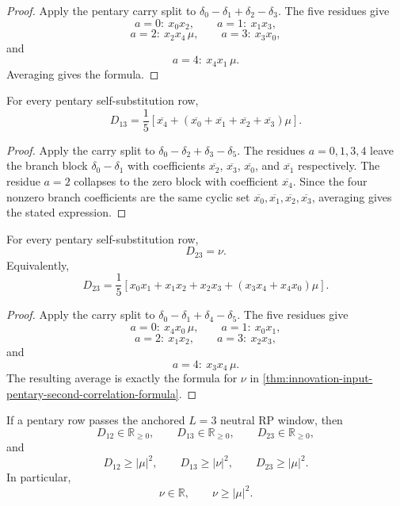 \begin{proof}
Apply the pentary carry split to
$\delta_0-\delta_1+\delta_2-\delta_3$. The five residues give
$$
a=0:\ x_0x_2,
\qquad
a=1:\ x_1x_3,
$$
$$
a=2:\ x_2x_4\,\mu,
\qquad
a=3:\ x_3x_0,
$$
and
$$
a=4:\ x_4x_1\,\mu.
$$
Averaging gives the formula.
\end{proof}

\begin{theorem}
\label{thm:innovation-input-pentary-dthirteen-formula}
For every pentary self-substitution row,
$$
D_{13}
=
\frac15
\left[
\overline{x_4}
+(\overline{x_0}+\overline{x_1}+\overline{x_2}+\overline{x_3})\mu
\right].
$$
\end{theorem}

\begin{proof}
Apply the carry split to
$\delta_0-\delta_2+\delta_3-\delta_5$. The residues $a=0,1,3,4$ leave
the branch block $\delta_0-\delta_1$ with coefficients
$\overline{x_2}$, $\overline{x_3}$, $\overline{x_0}$, and
$\overline{x_1}$ respectively. The residue $a=2$ collapses to the zero
block with coefficient $\overline{x_4}$. Since the four nonzero branch
coefficients are the same cyclic set
$\overline{x_0},\overline{x_1},\overline{x_2},\overline{x_3}$, averaging
gives the stated expression.
\end{proof}

\begin{theorem}
\label{thm:innovation-input-pentary-dtwentythree-correlation-meeting}
For every pentary self-substitution row,
$$
D_{23}=\nu.
$$
Equivalently,
$$
D_{23}
=
\frac15
\left[
x_0x_1+x_1x_2+x_2x_3+(x_3x_4+x_4x_0)\mu
\right].
$$
\end{theorem}

\begin{proof}
Apply the carry split to
$\delta_0-\delta_1+\delta_4-\delta_5$. The five residues give
$$
a=0:\ x_4x_0\,\mu,
\qquad
a=1:\ x_0x_1,
$$
$$
a=2:\ x_1x_2,
\qquad
a=3:\ x_2x_3,
$$
and
$$
a=4:\ x_3x_4\,\mu.
$$
The resulting average is exactly the formula for $\nu$ in
\autoref{thm:innovation-input-pentary-second-correlation-formula}.
\end{proof}

\begin{theorem}
\label{thm:innovation-input-pentary-three-link-necessary-condition}
If a pentary row passes the anchored $L=3$ neutral RP window, then
$$
D_{12}\in\mathbb R_{\ge0},
\qquad
D_{13}\in\mathbb R_{\ge0},
\qquad
D_{23}\in\mathbb R_{\ge0},
$$
and
$$
D_{12}\ge|\mu|^2,
\qquad
D_{13}\ge|\nu|^2,
\qquad
D_{23}\ge|\mu|^2.
$$
In particular,
$$
\nu\in\mathbb R,
\qquad
\nu\ge|\mu|^2.
$$
\end{theorem}

